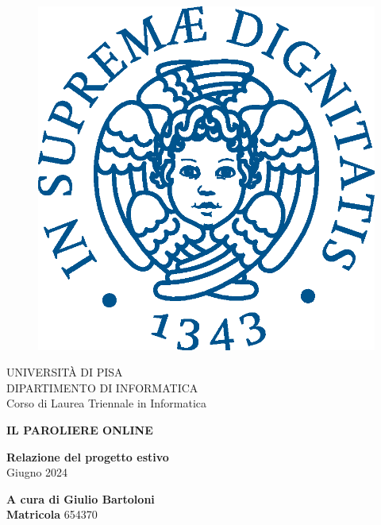 \begin{titlepage}
\begin{figure}[!htb]
    \centering
    \includegraphics[keepaspectratio=true,scale=0.5]{cherubino_pant541.eps}
\end{figure}

\begin{center}
    \LARGE{UNIVERSITÀ DI PISA}
    \vspace{5mm}
    \\ \large{DIPARTIMENTO DI INFORMATICA }
    \vspace{5mm}
    \\ \LARGE{Corso di Laurea Triennale in Informatica}
\end{center}

\vspace{15mm}
\begin{center}
    {\LARGE{\bf IL PAROLIERE ONLINE}}
\end{center}



\hfill

\begin{center}
    {\large{\bf Relazione del progetto estivo}
    \vspace{2mm}
    \\ \large{Giugno 2024}}
\end{center}

\vspace{50mm}

\begin{center}
    {\large{\bf A cura di Giulio Bartoloni}}
    \\{\small{\bf{Matricola}} \small{654370}}
\end{center}



\end{titlepage}